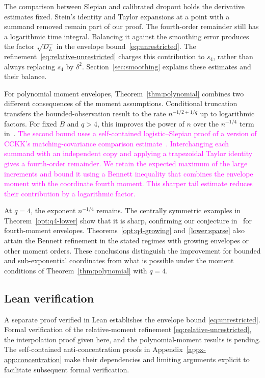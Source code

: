 \documentclass[11pt,letterpaper]{article}
\theoremstyle{remark}
\begin{document}
The comparison between Slepian and calibrated dropout holds the derivative
estimates fixed. Stein's identity and Taylor expansions at a point with
a summand removed remain part of our proof.
The fourth-order remainder still has a logarithmic time integral.
Balancing it against the smoothing error produces the factor
\(\sqrt{D_L}\) in the envelope bound~\eqref{eq:unrestricted}.
The refinement~\eqref{eq:relative-unrestricted} charges this contribution
to \(s_4\), rather than always replacing \(s_4\) by \(\delta^2\).
Section~\ref{sec:smoothing} explains these estimates and their balance.

For polynomial moment envelopes, Theorem~\ref{thm:polynomial} combines
two different consequences of the moment assumptions. Conditional
truncation transfers the bounded-observation result to the rate
\(n^{-1/2+1/q}\) up to logarithmic factors. For fixed \(B\) and
\(q>4\), this improves the power of \(n\) over the \(n^{-1/4}\)
term in~\cite[Theorem~2.5]{CCKK2022}.
\textcolor{magenta}{The second bound uses a self-contained logistic--Slepian
proof of a version of CCKK's matching-covariance comparison
estimate~\cite[Lemma~A.1]{CCKK2022}. Interchanging each summand with an
independent copy and applying a trapezoidal Taylor identity gives a
fourth-order remainder. We retain the expected maximum of the large
increments and bound it using a Bennett inequality that combines the
envelope moment with the coordinate fourth moment. This sharper tail
estimate reduces their contribution by a logarithmic factor.}

At \(q=4\), the exponent \(n^{-1/4}\) remains. The centrally symmetric
examples in Theorem~\ref{opt:q4-lower} show that it is sharp, confirming
our conjecture in~\cite{CCKK2022} for fourth-moment envelopes.
Theorems~\ref{opt:q4-growing} and~\ref{lower:sparse} also attain the
Bennett refinement in the stated regimes with growing envelopes or
other moment orders. These conclusions distinguish the improvement
for bounded and sub-exponential coordinates from what is possible
under the moment conditions of Theorem~\ref{thm:polynomial} with \(q=4\).


\subsection{Lean verification}\label{sec:lean-introduction}
A separate proof verified in Lean establishes the envelope bound \eqref{eq:unrestricted}. Formal verification of the relative-moment refinement \eqref{eq:relative-unrestricted}, the interpolation proof given here, and the polynomial-moment results is pending.
The self-contained anti-concentration proofs in
Appendix~\ref{appx-app:concentration} make their dependencies and limiting
arguments explicit to facilitate subsequent formal verification.
\end{document}
